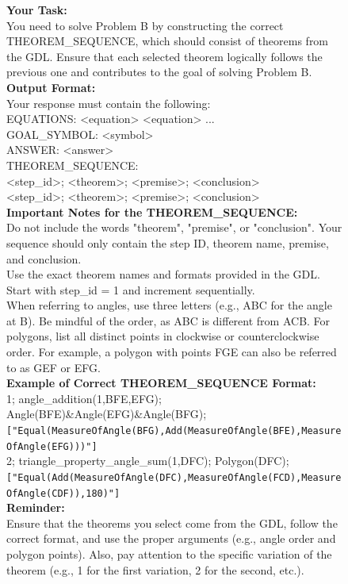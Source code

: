 \begin{figure}[t]
{\begin{minipage}{0.99\textwidth}
\textbf{Your Task:} \\
You need to solve Problem B by constructing the correct THEOREM\_SEQUENCE, which should consist of theorems from the GDL. Ensure that each selected theorem logically follows the previous one and contributes to the goal of solving Problem B. \\ 

\textbf{Output Format:} \\
Your response must contain the following: \\
EQUATIONS: <equation> <equation> ... \\
GOAL\_SYMBOL: <symbol> \\
ANSWER: <answer> \\
THEOREM\_SEQUENCE: \\
<step\_id>; <theorem>; <premise>; <conclusion> \\
<step\_id>; <theorem>; <premise>; <conclusion> \\ 

\textbf{Important Notes for the THEOREM\_SEQUENCE:} \\
Do not include the words "theorem", "premise", or "conclusion". Your sequence should only contain the step ID, theorem name, premise, and conclusion. \\
Use the exact theorem names and formats provided in the GDL. \\
Start with step\_id = 1 and increment sequentially. \\
When referring to angles, use three letters (e.g., ABC for the angle at B). Be mindful of the order, as ABC is different from ACB. For polygons, list all distinct points in clockwise or counterclockwise order. For example, a polygon with points FGE can also be referred to as GEF or EFG. \\

\textbf{Example of Correct THEOREM\_SEQUENCE Format:} \\
1; angle\_addition(1,BFE,EFG); \\
Angle(BFE)\&Angle(EFG)\&Angle(BFG); \\
\texttt{["Equal(MeasureOfAngle(BFG),Add(MeasureOfAngle(BFE),MeasureOfAngle(EFG)))"]} \\
2; triangle\_property\_angle\_sum(1,DFC); Polygon(DFC); \\
\texttt{["Equal(Add(MeasureOfAngle(DFC),MeasureOfAngle(FCD),MeasureOfAngle(CDF)),180)"]} \\


\textbf{Reminder:} \\
Ensure that the theorems you select come from the GDL, follow the correct format, and use the proper arguments (e.g., angle order and polygon points). 
Also, pay attention to the specific variation of the theorem (e.g., 1 for the first variation, 2 for the second, etc.).


\end{minipage}}
\end{figure}
